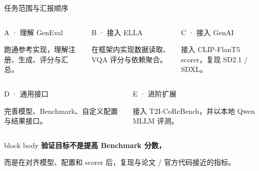 \documentclass[aspectratio=169,10pt]{beamer}
\begin{document}
\begin{frame}{任务范围与汇报顺序}
  \begin{columns}[T,onlytextwidth]
      \begin{block}{A · 理解 GenEval}
        \begin{minipage}[c][1.35cm][c]{\linewidth}
          \centering\small 跑通参考实现，理解注册、生成、评分与汇总。
        \end{minipage}
      \end{block}
      \begin{block}{B · 接入 ELLA}
        \begin{minipage}[c][1.35cm][c]{\linewidth}
          \centering\small 在框架内实现数据读取、VQA 评分与依赖聚合。
        \end{minipage}
      \end{block}
      \begin{block}{C · 接入 GenAI}
        \begin{minipage}[c][1.35cm][c]{\linewidth}
          \centering\small 接入 CLIP-FlanT5 scorer，复现 SD2.1 / SDXL。
        \end{minipage}
      \end{block}
  \end{columns}

  \vspace{0.35em}
  \begin{columns}[T,onlytextwidth]
      \begin{block}{D · 通用接口}
        \begin{minipage}[c][1.15cm][c]{\linewidth}
          \centering\small 完善模型、Benchmark、自定义配置与结果接口。
        \end{minipage}
      \end{block}
      \begin{block}{E · 进阶扩展}
        \begin{minipage}[c][1.15cm][c]{\linewidth}
          \centering\small 接入 T2I-CoReBench，并以本地 Qwen MLLM 评测。
        \end{minipage}
      \end{block}
  \end{columns}

  \vspace{0.45em}
  \begin{beamercolorbox}[sep=0.65em,rounded=true]{block body}
    \centering
    \textbf{验证目标不是提高 Benchmark 分数，}\par
    而是在对齐模型、配置和 scorer 后，复现与论文 / 官方代码接近的指标。
  \end{beamercolorbox}
\end{frame}
\end{document}
